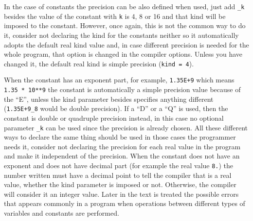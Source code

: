 In the case of constants the precision can be also defined when used, just add \texttt{\_k} besides the value of the constant with \texttt{k} is 4, 8 or 16 and that kind will be imposed to the constant. However, once again, this is not the common way to do it, consider not declaring the kind for the constants neither so it automatically adopts the default real kind value and, in case different precision is needed for the whole program, that option is changed in the compiler options. Unless you have changed it, the default real kind is simple precision (\texttt{kind = 4}). 

When the constant has an exponent part, for example, \texttt{1.35E+9} which means \texttt{1.35 * 10**9} the constant is automatically a simple precision value because of the ``E'', unless the kind parameter besides specifies anything different (\texttt{1.35E+9\_8} would be double precision). If a ``D'' or a ``Q'' is used, then the constant is double or quadruple precision instead, in this case no optional parameter \texttt{\_k} can be used since the precision is already chosen. All these different ways to declare the same thing should be used in those cases the programmer needs it, consider not declaring the precision for each real value in the program and make it independent of the precision. When the constant does not have an exponent and does not have decimal part (for example the real value \texttt{8.}) the number written must have a decimal point to tell the compiler that is a real value, whether the kind parameter is imposed or not. Otherwise, the compiler will consider it an integer value. Later in the text is treated the possible errors that appears commonly in a program when operations between different types of variables and constants are performed.


